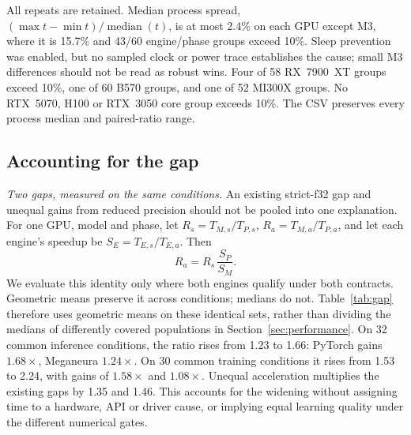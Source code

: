 \documentclass[conference]{IEEEtran}
\newcommand{\system}{Meganeura}
\begin{document}
All repeats are retained. Median process spread,
$(\max t-\min t)/\operatorname{median}(t)$, is at most 2.4\% on each GPU
except M3, where it is 15.7\% and 43/60 engine/phase groups exceed 10\%.
Sleep prevention was enabled, but no sampled clock or power trace establishes
the cause; small M3 differences should not be read as robust wins. Four of
58 RX~7900~XT groups exceed 10\%, one of 60 B570 groups, and one of 52
MI300X groups. No RTX~5070, H100 or RTX~3050 core group exceeds 10\%. The CSV preserves
every process median and paired-ratio range.

\subsection{Accounting for the gap}
\label{sec:gaps}

\emph{Two gaps, measured on the same conditions.}
An existing strict-f32 gap and unequal gains from reduced precision should
not be pooled into one explanation. For one GPU, model and phase, let
$R_s=T_{M,s}/T_{P,s}$, $R_a=T_{M,a}/T_{P,a}$, and let each engine's speedup
be $S_E=T_{E,s}/T_{E,a}$. Then
\begin{equation}
 R_a = R_s\,\frac{S_P}{S_M}.
 \label{eq:gap}
\end{equation}
We evaluate this identity only where both engines qualify under both
contracts. Geometric means preserve it across conditions; medians do not.
Table~\ref{tab:gap} therefore uses geometric means on these identical sets,
rather than dividing the medians of differently covered populations in
Section~\ref{sec:performance}. On 32 common inference conditions, the ratio
rises from 1.23 to 1.66: PyTorch gains $1.68\times$, \system{} $1.24\times$.
On 30 common training conditions it rises from 1.53 to 2.24, with gains of
$1.58\times$ and $1.08\times$. Unequal acceleration multiplies the existing
gaps by 1.35 and 1.46. This accounts for the widening without assigning time
to a hardware, API or driver cause, or implying equal learning quality under
the different numerical gates.

\begin{table}[t]
\centering
\caption{Gap accounting on identical qualified core conditions. All entries
except $n$ are geometric means. $R$: Meganeura/PyTorch time; $S$: strict/
accelerated time. $s$: strict, $a$: accelerated, $P$: PyTorch, $M$: Meganeura.
Numbers are rounded after aggregation; these are not the medians of
Table~\ref{tab:performance}. M3 variability
and the small MI300X denominator still apply.}
\label{tab:gap}
\footnotesize\setlength{\tabcolsep}{2.3pt}

\end{table}
\end{document}
